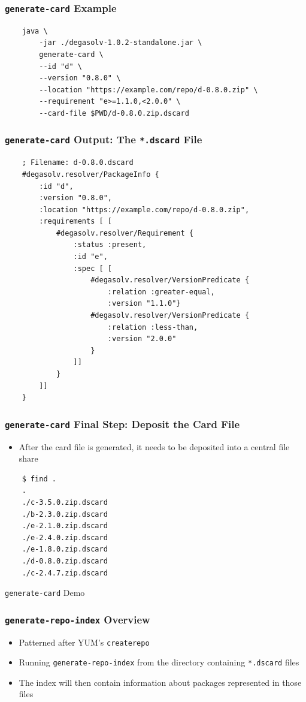\documentclass{beamer}
\begin{document}
\begin{frame}[fragile]
  \frametitle{\texttt{generate-card} Example}
\begin{verbatim}
    java \
        -jar ./degasolv-1.0.2-standalone.jar \
        generate-card \
        --id "d" \
        --version "0.8.0" \
        --location "https://example.com/repo/d-0.8.0.zip" \
        --requirement "e>=1.1.0,<2.0.0" \
        --card-file $PWD/d-0.8.0.zip.dscard
\end{verbatim}
\end{frame}
\begin{frame}[fragile]
  \frametitle{\texttt{generate-card} Output: The \texttt{*.dscard} File}
\begin{verbatim}
    ; Filename: d-0.8.0.dscard
    #degasolv.resolver/PackageInfo {
        :id "d",
        :version "0.8.0",
        :location "https://example.com/repo/d-0.8.0.zip",
        :requirements [ [
            #degasolv.resolver/Requirement {
                :status :present,
                :id "e",
                :spec [ [
                    #degasolv.resolver/VersionPredicate {
                        :relation :greater-equal,
                        :version "1.1.0"}
                    #degasolv.resolver/VersionPredicate {
                        :relation :less-than,
                        :version "2.0.0"
                    }
                ]]
            }
        ]]
    }
\end{verbatim}
\end{frame}
\begin{frame}[fragile]
  \frametitle{\texttt{generate-card} Final Step: Deposit the Card File}
  \begin{itemize}
  \item After the card file is generated, it needs to be deposited into a
    central file share
  \end{itemize}
\begin{verbatim}
    $ find .
    .
    ./c-3.5.0.zip.dscard
    ./b-2.3.0.zip.dscard
    ./e-2.1.0.zip.dscard
    ./e-2.4.0.zip.dscard
    ./e-1.8.0.zip.dscard
    ./d-0.8.0.zip.dscard
    ./c-2.4.7.zip.dscard
\end{verbatim}
\end{frame}
\begin{frame}
  \centerline{\color{blue}\Large \texttt{generate-card} Demo}
\end{frame}
\begin{frame}
  \frametitle{\texttt{generate-repo-index} Overview}
  \begin{itemize}
  \item Patterned after YUM's \texttt{createrepo}
  \item Running \texttt{generate-repo-index} from the directory containing \texttt{*.dscard}
    files
  \item The index will then contain information about packages represented in those
    files
  \end{itemize}
\end{frame}
\end{document}
